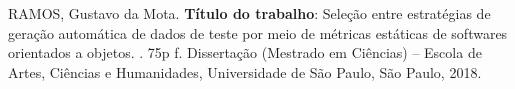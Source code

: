 \documentclass[
	12pt,				%
	oneside,			%
	a4paper,			%
	english,			%
	brazil				%
	]{abntex2ppgsi}
\begin{document}

%
% 



\setlength{\absparsep}{18pt} %
\begin{resumo}

% 
%
% 
%
\begin{flushleft}
RAMOS, Gustavo da Mota. \textbf{Título do trabalho}: Seleção entre estratégias de geração automática de dados de teste por meio de métricas estáticas de softwares orientados a objetos. \imprimirdata. 75p f. Dissertação (Mestrado em Ciências) – Escola de Artes, Ciências e Humanidades, Universidade de São Paulo, São Paulo, 2018.
\end{flushleft}


\end{resumo}
\end{document}
